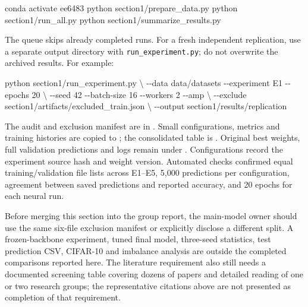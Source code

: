 \documentclass[
  10pt,
  a4paper,
]{article}
\newenvironment{Shaded}{}{}
\newcommand{\AttributeTok}[1]{\textcolor[rgb]{0.49,0.56,0.16}{#1}}
\newcommand{\DataTypeTok}[1]{\textcolor[rgb]{0.56,0.13,0.00}{#1}}
\newcommand{\ExtensionTok}[1]{#1}
\newcommand{\NormalTok}[1]{#1}
\begin{document}
\begin{Shaded}
\begin{Highlighting}[]
\ExtensionTok{conda}\NormalTok{ activate ee6483}
\ExtensionTok{python}\NormalTok{ section1/prepare\_data.py}
\ExtensionTok{python}\NormalTok{ section1/run\_all.py}
\ExtensionTok{python}\NormalTok{ section1/summarize\_results.py}
\end{Highlighting}
\end{Shaded}

The queue skips already completed runs. For a fresh independent
replication, use a separate output directory with
\texttt{run\_experiment.py}; do not overwrite the archived results. For
example:

\begin{Shaded}
\begin{Highlighting}[]
\ExtensionTok{python}\NormalTok{ section1/run\_experiment.py }\DataTypeTok{\textbackslash{}}
  \AttributeTok{{-}{-}data}\NormalTok{ data/datasets }\AttributeTok{{-}{-}experiment}\NormalTok{ E1 }\AttributeTok{{-}{-}epochs}\NormalTok{ 20 }\DataTypeTok{\textbackslash{}}
  \AttributeTok{{-}{-}seed}\NormalTok{ 42 }\AttributeTok{{-}{-}batch{-}size}\NormalTok{ 16 }\AttributeTok{{-}{-}workers}\NormalTok{ 2 }\AttributeTok{{-}{-}amp} \DataTypeTok{\textbackslash{}}
  \AttributeTok{{-}{-}exclude}\NormalTok{ section1/artifacts/excluded\_train.json }\DataTypeTok{\textbackslash{}}
  \AttributeTok{{-}{-}output}\NormalTok{ section1/results/replication}
\end{Highlighting}
\end{Shaded}

The audit and exclusion manifest are in .
Small configurations, metrics and training histories are copied to
; the consolidated table is
. Original best weights, full
validation predictions and logs remain under
. Configurations record the experiment
source hash and weight version. Automated checks confirmed equal
training/validation file lists across E1--E5, 5,000 predictions per
configuration, agreement between saved predictions and reported
accuracy, and 20 epochs for each neural run.

Before merging this section into the group report, the main-model owner
should use the same six-file exclusion manifest or explicitly disclose a
different split. A frozen-backbone experiment, tuned final model,
three-seed statistics, test prediction CSV, CIFAR-10 and imbalance
analysis are outside the completed comparisons reported here. The
literature requirement also still needs a documented screening table
covering dozens of papers and detailed reading of one or two research
groups; the representative citations above are not presented as
completion of that requirement.
\end{document}
